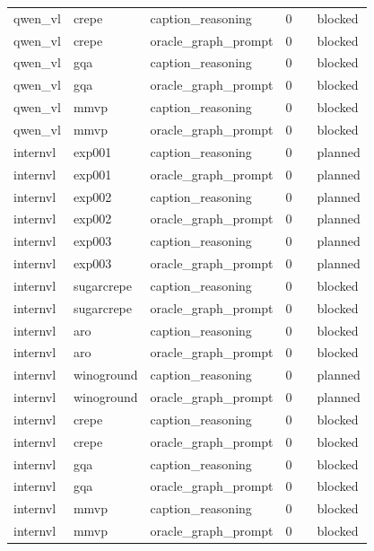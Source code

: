 \begin{table}[t]
\begin{tabular}{llllll}
qwen\_vl & crepe & caption\_reasoning & 0 &  & blocked \\
qwen\_vl & crepe & oracle\_graph\_prompt & 0 &  & blocked \\
qwen\_vl & gqa & caption\_reasoning & 0 &  & blocked \\
qwen\_vl & gqa & oracle\_graph\_prompt & 0 &  & blocked \\
qwen\_vl & mmvp & caption\_reasoning & 0 &  & blocked \\
qwen\_vl & mmvp & oracle\_graph\_prompt & 0 &  & blocked \\
internvl & exp001 & caption\_reasoning & 0 &  & planned \\
internvl & exp001 & oracle\_graph\_prompt & 0 &  & planned \\
internvl & exp002 & caption\_reasoning & 0 &  & planned \\
internvl & exp002 & oracle\_graph\_prompt & 0 &  & planned \\
internvl & exp003 & caption\_reasoning & 0 &  & planned \\
internvl & exp003 & oracle\_graph\_prompt & 0 &  & planned \\
internvl & sugarcrepe & caption\_reasoning & 0 &  & blocked \\
internvl & sugarcrepe & oracle\_graph\_prompt & 0 &  & blocked \\
internvl & aro & caption\_reasoning & 0 &  & blocked \\
internvl & aro & oracle\_graph\_prompt & 0 &  & blocked \\
internvl & winoground & caption\_reasoning & 0 &  & planned \\
internvl & winoground & oracle\_graph\_prompt & 0 &  & planned \\
internvl & crepe & caption\_reasoning & 0 &  & blocked \\
internvl & crepe & oracle\_graph\_prompt & 0 &  & blocked \\
internvl & gqa & caption\_reasoning & 0 &  & blocked \\
internvl & gqa & oracle\_graph\_prompt & 0 &  & blocked \\
internvl & mmvp & caption\_reasoning & 0 &  & blocked \\
internvl & mmvp & oracle\_graph\_prompt & 0 &  & blocked \\
\bottomrule
\end{tabular}
\end{table}
